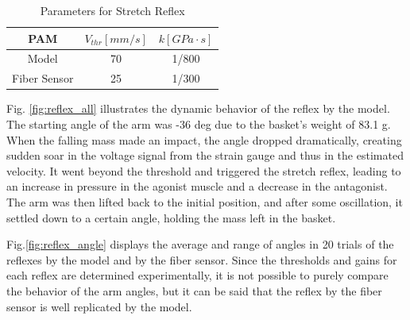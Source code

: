 \begin{table}[h]
    \centering
    \caption{Parameters for Stretch Reflex} 
    \begin{tabular}{c|cc}
        \hline
        PAM &$V_{thr} [\si{mm/s}]$&$ k [\si{GPa\cdot s}]$\\
        \hline \hline
        Model & 70 & 1/800\\
        Fiber Sensor & 25 & 1/300\\
        \hline
    \end{tabular}
\label{tab:reflex_para}
\end{table}

Fig. \ref{fig:reflex_all} illustrates the dynamic behavior of the reflex by the model. The starting angle of the arm was -36 deg due to the basket's weight of 83.1 g. When the falling mass made an impact, the angle dropped dramatically, creating sudden soar in the voltage signal from the strain gauge and thus in the estimated velocity. It went beyond the threshold and triggered the stretch reflex, leading to an increase in pressure in the agonist muscle and a decrease in the antagonist. The arm was then lifted back to the initial position, and after some oscillation, it settled down to a certain angle, holding the mass left in the basket.


Fig.\ref{fig:reflex_angle} displays the average and range of angles in 20 trials of the reflexes by the model and by the fiber sensor. Since the thresholds and gains for each reflex are determined experimentally, it is not possible to purely compare the behavior of the arm angles, but it can be said that the reflex by the fiber sensor is well replicated by the model.


